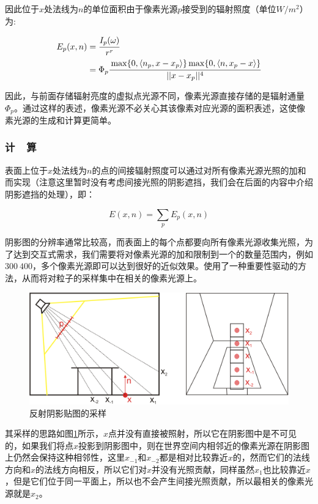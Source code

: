 \noindent 因此位于$x$处法线为$n$的单位面积由于像素光源$p$接受到的辐射照度（单位$W/m^{2}$）为:

\begin{equation}
\begin{aligned}
	E_p(x,n)&= \cfrac{I_p(\omega)}{r^{r}} \\
			&=\Phi_p \cfrac{\max\{0,\langle n_p,x-x_p \rangle\}\max\{0,\langle n,x_p-x \rangle \}}{||x-x_p||^{4}}
\end{aligned}
\end{equation}

因此，与前面存储辐射亮度的虚拟点光源不同，像素光源直接存储的是辐射通量$\Phi_p$。通过这样的表述，像素光源不必关心其该像素对应光源的面积表述，这使像素光源的生成和计算更简单。




\subsubsection{计~~算}\label{sec:ir-rsm-sampling}
表面上位于$x$处法线为$n$的点的间接辐射照度可以通过对所有像素光源光照的加和而实现（注意这里暂时没有考虑间接光照的阴影遮挡，我们会在后面的内容中介绍阴影遮挡的处理），即：

\begin{equation}
	E(x,n)=\sum_{p}E_p(x,n)
\end{equation}

\noindent 阴影图的分辨率通常比较高，而表面上的每个点都要向所有像素光源收集光照，为了达到交互式需求，我们需要将对像素光源的加和限制到一个的数量范围内，例如$300~400$，多个像素光源即可以达到很好的近似效果。\cite{a:ReflectiveShadowMaps}使用了一种重要性驱动的方法，从而将对粒子的采样集中在相关的像素光源上。

\begin{figure}
\sidecaption
	\includegraphics[width=.65\textwidth]{figures/ir/ir-2-2}	
	\caption{反射阴影贴图的采样}
	\label{f:ir-rsm-sampling}
\end{figure}

其采样的思路如图\ref{f:ir-rsm-sampling}所示，$x$点并没有直接被照射，所以它在阴影图中是不可见的，如果我们将点$x$投影到阴影图中，则在世界空间内相邻近的像素光源在阴影图上仍然会保持这种相邻性，这里$x_{-1}$和$x_{-2}$都是相对比较靠近$x$的，然而它们的法线方向和$x$的法线方向相反，所以它们对$x$并没有光照贡献，同样虽然$x_1$也比较靠近$x$，但是它们位于同一平面上，所以也不会产生间接光照贡献，所以最相关的像素光源就是$x_2$。

